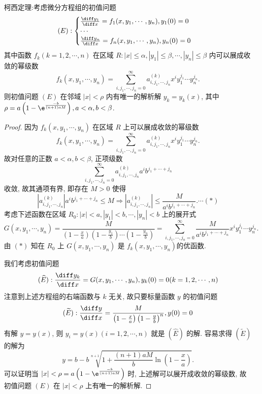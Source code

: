 \begin{solve}
  柯西定理:考虑微分方程组的初值问题
  \[(E):\begin{cases}
  \frac{\diff y_1}{\diff x}=f_1(x,y_1,\cdots,y_n),y_1(0)=0\\
  \cdots\\
  \frac{\diff y_n}{\diff x}=f_n(x,y_1,\cdots,y_n),y_n(0)=0
  \end{cases}\]
  其中函数 $f_k(k=1,2,\cdots,n)$ 在区域 
  $R:|x|\leq\alpha,|y_1|\leq\beta,\cdots,|y_n|\leq\beta$ 内可以展成收敛的幂级数
  \[f_k(x,y_1,\cdots,y_n)=\sum_{i,j_1,\cdots,j_n=0}^{\infty}a_{i,j_1,\cdots,j_n}^{(k)}x^iy_1^{j_1}\cdots y_n^{j_n}.\]
  则初值问题 $(E)$ 在邻域 $|x|<\rho$ 内有唯一的解析解 $y_k=y_k(x)$, 
  其中 $\displaystyle\rho=a\left(1-\e^{\frac{-b}{(n+1)aM}}\right),a<\alpha,b<\beta$.

  \begin{proof}
    因为 $f_k(x,y_1,\cdots,y_n)$ 在区域 $R$ 上可以展成收敛的幂级数
    \[f_k(x,y_1,\cdots,y_n)=\sum_{i,j_1,\cdots,j_n=0}^{\infty}a_{i,j_1,\cdots,j_n}^{(k)}x^iy_1^{j_1}\cdots y_n^{j_n}.\]
    故对任意的正数 $a<\alpha,b<\beta$, 正项级数
    \[\sum_{i,j_1,\cdots,j_n=0}^{\infty}a_{i,j_1,\cdots,j_n}^{(k)}a^ib^{j_1+\cdots+j_n}\]
    收敛, 故其通项有界, 即存在 $M>0$ 使得
    \[\left|a_{i,j_1,\cdots,j_n}^{(k)}\right|a^ib^{j_1+\cdots+j_n}\leq M\Rightarrow\left|a_{i,j_1,\cdots,j_n}^{(k)}\right|\leq\frac{M}{a^ib^{j_1+\cdots+j_n}}.\cdots(*)\]
    考虑下述函数在区域 $R_0:|x|<a,|y_1|<b,\cdots,|y_n|<b$ 上的展开式
    \[G(x,y_1,\cdots,y_n)
      = \frac{M}{\left(1-\frac{x}{a}\right)\left(1-\frac{y_1}{b}\right)
        \cdots\left(1-\frac{y_n}{b}\right)}
      = \sum_{i,j_1,\cdots,j_n=0}^{\infty}\frac{M}{a^ib^{j_1+\cdots+j_n}}x^iy_1^{j_1}\cdots y_n^{j_n}.\]
    由 $(*)$ 知在 $R_0$ 上 $G(x,y_1,\cdots,y_n)$ 是 $f_k(x,y_1,\cdots,y_n)$的优函数.

    我们考虑初值问题
    \[(\widehat{E}):\frac{\diff y_k}{\diff x}=G(x,y_1,\cdots,y_n),y_k(0)=0(k=1,2,\cdots,n)\]
    注意到上述方程组的右端函数与 $k$ 无关, 故只要标量函数 $y$ 的初值问题
    \[(\widetilde{E}):\frac{\diff y}{\diff x}
      =\frac{M}{\left(1-\frac{x}{a}\right)\left(1-\frac{y}{b}\right)^n},y(0)=0\]
    有解 $y=y(x)$, 则 $y_i=y(x)(i=1,2,\cdots,n)$ 就是 $(\widehat{E})$ 的解.
    容易求得 $(\widetilde{E})$ 的解为
    \[y=b-b\sqrt[n+1]{1+\frac{(n+1)aM}{b}\ln\left(1-\frac{x}{a}\right)}.\]
    可以证明当 $\displaystyle|x|<\rho=a\left(1-\e^{\frac{-b}{(n+1)aM}}\right)$ 时,
    上述解可以展开成收敛的幂级数, 故初值问题 $(E)$ 在 $|x|<\rho$ 上有唯一的解析解.
  \end{proof}
\end{solve}



